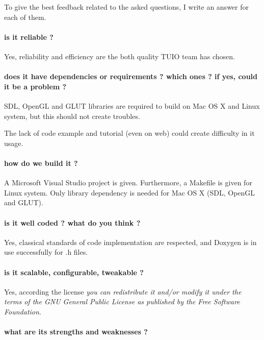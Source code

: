  
To give the best feedback related to the asked questions, I write an answer for each of them. 

\paragraph*{is it reliable ?}

Yes, reliability and efficiency are the both quality TUIO team has chosen.

\paragraph*{does it have dependencies or requirements ? which ones ? if yes, could it be a problem ?}

SDL, OpenGL and GLUT libraries are required to build on Mac OS X and Linux system, but this should not create troubles.

The lack of code example and tutorial (even on web) could create difficulty in it usage.

\paragraph*{how do we build it ?}

A Microsoft Visual Studio project is given. Furthermore, a Makefile is given for Linux system. Only library dependency is needed for Mac OS X (SDL, OpenGL and GLUT).

\paragraph*{is it well coded ? what do you think ?}

Yes, classical standards of code implementation are respected, and Doxygen is in use successfully for .h files.

\paragraph*{is it scalable, configurable, tweakable ?}

Yes, according the license \textit{you can redistribute it and/or modify it under the terms of the GNU General Public License as published by the Free Software Foundation}.

\paragraph*{what are its strengths and weaknesses ?}

